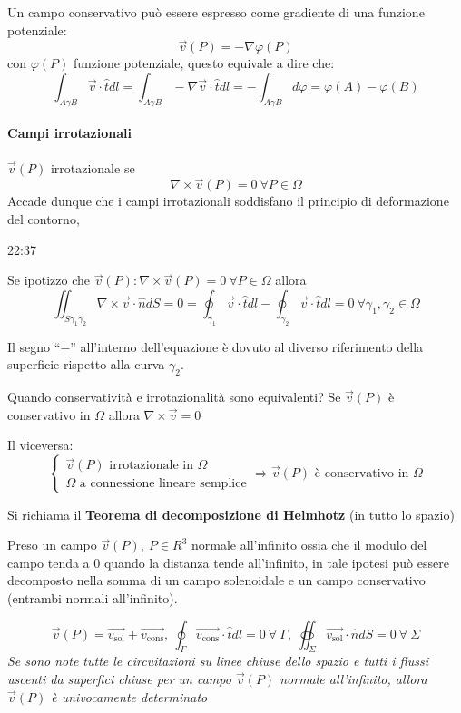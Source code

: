 Un campo conservativo può essere espresso come gradiente di una funzione potenziale:
$$
\vec{v}(P) = -\nabla\varphi(P)
$$
con $\varphi(P)$ funzione potenziale, questo equivale a dire che:
$$
\int_{A\gamma B} \vec{v}\cdot \hat{t} dl = \int_{A\gamma B} -\nabla\vec{v}\cdot\hat{t} dl = -\int_{A\gamma B} d\varphi = \varphi(A) - \varphi(B)
$$

\paragraph{Campi irrotazionali}
$\vec{v}(P)$ irrotazionale se 
$$
\nabla\times \vec{v}(P) = 0\  \forall P \in \Omega
$$
Accade dunque che i campi irrotazionali soddisfano il principio di deformazione del contorno,

22:37

Se ipotizzo che $\vec{v}(P) : \nabla\times\vec{v}(P) =0\ \forall P \in \Omega$
allora 
$$
\iint_{S\gamma_1\gamma_2} \nabla\times\vec{v}\cdot\hat{n}dS = 0 = \oint_{\gamma_1} \vec{v}\cdot\hat{t} dl - \oint_{\gamma_2} \vec{v}\cdot\hat{t}dl = 0\ \forall\gamma_1,\gamma_2\in \Omega
$$

Il segno ``$-$'' all'interno dell'equazione è dovuto al diverso riferimento della superficie rispetto alla
curva $\gamma_2$.

Quando conservatività e irrotazionalità sono equivalenti?
Se $\vec{v}(P)$ è conservativo in $\Omega $ allora $\nabla\times\vec{v}=0$

Il viceversa:
$$
\begin{cases}
\vec{v}(P) \text{ irrotazionale in }\Omega \\
\Omega \text{ a connessione lineare semplice}
\end{cases}
\Rightarrow \vec{v}(P) \text{ è conservativo in }\Omega
$$

Si richiama il \textbf{Teorema di decomposizione di Helmhotz} (in tutto lo spazio)

Preso un campo $\vec{v}(P),\ P \in R^3$ normale all'infinito ossia che il modulo del campo tenda
a 0 quando la distanza tende all'infinito, in tale ipotesi può essere decomposto nella somma
di un campo solenoidale e un campo conservativo (entrambi normali all'infinito).

$$
\vec{v}(P) = \vec{v_\text{sol}} + \vec{v_{\text{cons}}},\ 
\oint_{\Gamma}\vec{v_\text{cons}}\cdot\hat{t} dl = 0\ \forall\ \Gamma,\ \oiint_{\Sigma}
\vec{v_{\text{sol}}}\cdot\hat{n}dS = 0\ \forall\ \Sigma 
$$
\textit{Se sono note tutte le circuitazioni su linee chiuse dello spazio e tutti i flussi uscenti da
superfici chiuse per un campo $\vec{v}(P)$ normale all'infinito, allora $\vec{v}(P)$ è univocamente
determinato}

